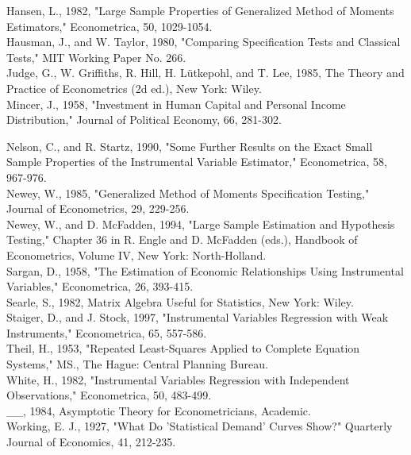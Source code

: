 \documentclass[10pt]{article}
\begin{document}
Hansen, L., 1982, "Large Sample Properties of Generalized Method of Moments Estimators," Econometrica, 50, 1029-1054.\\
Hausman, J., and W. Taylor, 1980, "Comparing Specification Tests and Classical Tests," MIT Working Paper No. 266.\\
Judge, G., W. Griffiths, R. Hill, H. Lütkepohl, and T. Lee, 1985, The Theory and Practice of Econometrics (2d ed.), New York: Wiley.\\
Mincer, J., 1958, "Investment in Human Capital and Personal Income Distribution," Journal of Political Economy, 66, 281-302.

Nelson, C., and R. Startz, 1990, "Some Further Results on the Exact Small Sample Properties of the Instrumental Variable Estimator," Econometrica, 58, 967-976.\\
Newey, W., 1985, "Generalized Method of Moments Specification Testing," Journal of Econometrics, 29, 229-256.\\
Newey, W., and D. McFadden, 1994, "Large Sample Estimation and Hypothesis Testing," Chapter 36 in R. Engle and D. McFadden (eds.), Handbook of Econometrics, Volume IV, New York: North-Holland.\\
Sargan, D., 1958, "The Estimation of Economic Relationships Using Instrumental Variables," Econometrica, 26, 393-415.\\
Searle, S., 1982, Matrix Algebra Useful for Statistics, New York: Wiley.\\
Staiger, D., and J. Stock, 1997, "Instrumental Variables Regression with Weak Instruments," Econometrica, 65, 557-586.\\
Theil, H., 1953, "Repeated Least-Squares Applied to Complete Equation Systems," MS., The Hague: Central Planning Bureau.\\
White, H., 1982, "Instrumental Variables Regression with Independent Observations," Econometrica, 50, 483-499.\\
\_\_, 1984, Asymptotic Theory for Econometricians, Academic.\\
Working, E. J., 1927, "What Do 'Statistical Demand' Curves Show?" Quarterly Journal of Economics, 41, 212-235.
\end{document}
